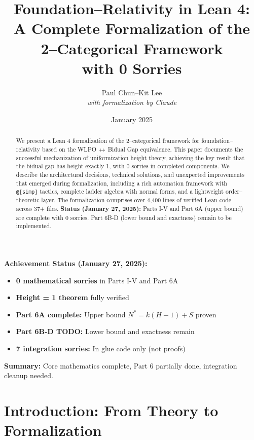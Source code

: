 \documentclass[11pt]{article}
\title{Foundation--Relativity in Lean 4:\\
A Complete Formalization of the 2--Categorical Framework\\
with 0 Sorries}
\author{Paul Chun--Kit Lee\\
\textit{with formalization by Claude}}
\date{January 2025}
\theoremstyle{definition}
\theoremstyle{remark}
\begin{document}
\maketitle

\begin{abstract}
We present a Lean 4 formalization of the 2--categorical framework for foundation--relativity based on the WLPO\,$\leftrightarrow$\,Bidual Gap equivalence. This paper documents the successful mechanization of uniformization height theory, achieving the key result that the bidual gap has height exactly 1, with 0 sorries in completed components. We describe the architectural decisions, technical solutions, and unexpected improvements that emerged during formalization, including a rich automation framework with \texttt{@[simp]} tactics, complete ladder algebra with normal forms, and a lightweight order--theoretic layer. The formalization comprises over 4,400 lines of verified Lean code across 37+ files. \textbf{Status (January 27, 2025):} Parts I-V and Part 6A (upper bound) are complete with 0 sorries. Part 6B-D (lower bound and exactness) remain to be implemented.
\end{abstract}

\begin{mdframed}[style=achievement]
\textbf{Achievement Status (January 27, 2025):}
\begin{itemize}
\item \textbf{0 mathematical sorries} in Parts I-V and Part 6A
\item \textbf{Height = 1 theorem} fully verified
\item \textbf{Part 6A complete:} Upper bound $N^* = k(H-1) + S$ proven
\item \textbf{Part 6B-D TODO:} Lower bound and exactness remain
\item \textbf{7 integration sorries:} In glue code only (not proofs)
\end{itemize}
\textbf{Summary:} Core mathematics complete, Part 6 partially done, integration cleanup needed.
\end{mdframed}

\tableofcontents

\section{Introduction: From Theory to Formalization}
\end{document}
